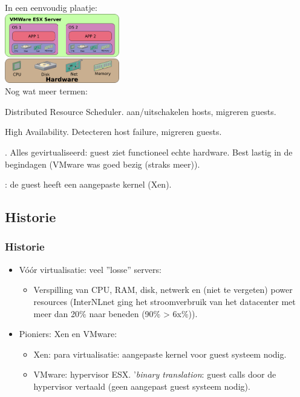 \begin{styleframe}
    \frametitle{}
In een eenvoudig plaatje:\\
\includegraphics[width=5cm]{img/VMware-schema.png}\\
\pause
Nog wat meer termen:
\begin{description}[blaat]
	\item[DRS] Distributed Resource Scheduler. aan/uitschakelen hosts, migreren guests.
	\pause
	\item[HA] High Availability. Detecteren host failure, migreren guests.
	\pause
	\item [volledige ({\it full}) virtualisatie]. Alles gevirtualiseerd: guest ziet functioneel echte hardware. Best lastig in de begindagen (VMware was goed bezig (straks meer)).
	\pause
	\item [para virtualisatie]: de guest heeft een aangepaste kernel (Xen).
\end{description}
\end{styleframe}

\subsection{Historie}
\begin{styleframe}
    \frametitle{Historie}
\begin{itemize}
	\item V\'o\'or virtualisatie: veel ''losse'' servers:
	\pause
	\begin{itemize}
		\item Verspilling van CPU, RAM, disk, netwerk en (niet te vergeten) power resources (InterNLnet ging het stroomverbruik van het datacenter met meer dan 20\% naar beneden (90\% \-> 6x\%)).
		\pause
	\end{itemize}
	\item Pioniers: Xen en VMware:
	\pause
	\begin{itemize}
		\item Xen: para virtualisatie: aangepaste kernel voor guest systeem nodig.
		\pause
		\item VMware: hypervisor ESX. '{\it binary translation}: guest calls door de hypervisor vertaald (geen aangepast guest systeem nodig).
	\end{itemize}
\end{itemize}
\end{styleframe}

